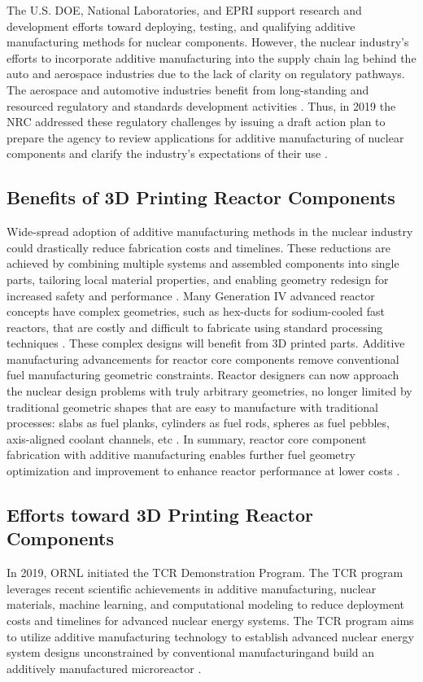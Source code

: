 The U.S. \gls{DOE}, National Laboratories, and \gls{EPRI} support research and 
development efforts toward deploying, testing, and qualifying additive 
manufacturing methods for nuclear components. 
However, the nuclear industry's efforts to incorporate additive manufacturing 
into the supply chain lag behind the auto and aerospace industries due to the 
lack of clarity on regulatory pathways. 
The aerospace and automotive industries benefit from long-standing and resourced 
regulatory and standards development activities \cite{noauthor_roadmap_nodate}. 
Thus, in 2019 the \gls{NRC} addressed these regulatory challenges by issuing 
a draft action plan to prepare the agency to review applications for 
additive manufacturing of nuclear components and clarify the industry's 
expectations of their use \cite{noauthor_roadmap_nodate}.

\subsection{Benefits of 3D Printing Reactor Components}
\label{sec:am}
Wide-spread adoption of additive manufacturing methods in the nuclear industry 
could drastically reduce fabrication costs and timelines.
These reductions are achieved by combining multiple systems and assembled 
components into single parts, tailoring local material properties, and enabling 
geometry redesign for increased safety and performance 
\cite{simpson_considerations_2019}. 
Many Generation IV advanced reactor concepts have complex geometries, 
such as hex-ducts for sodium-cooled fast reactors, that are costly and difficult 
to fabricate using standard processing techniques \cite{sridharan_performance_2019}.  
These complex designs will benefit from 3D printed parts. 
Additive manufacturing advancements for reactor core components remove
conventional fuel manufacturing geometric constraints.
Reactor designers can now approach the nuclear design problems with truly 
arbitrary geometries, no longer limited by traditional geometric shapes that are 
easy to manufacture with traditional processes: slabs as fuel planks, cylinders 
as fuel rods, spheres as fuel pebbles, axis-aligned coolant channels, etc 
\cite{sobes_artificial_2020}.
In summary, reactor core component fabrication with additive manufacturing 
enables further fuel geometry optimization and improvement to enhance 
reactor performance at lower costs \cite{bergeron_early_2018}. 

\subsection{Efforts toward 3D Printing Reactor Components}
In 2019, \gls{ORNL} initiated the \gls{TCR} Demonstration Program.
The \gls{TCR} program leverages recent scientific achievements in additive 
manufacturing, nuclear materials, machine learning, and computational modeling
to reduce deployment costs and timelines for advanced nuclear energy systems. 
The \gls{TCR} program aims to utilize additive manufacturing technology to 
establish advanced nuclear energy system designs unconstrained by conventional 
manufacturingand build an additively manufactured microreactor 
\cite{terrani_transformational_2019}. 

